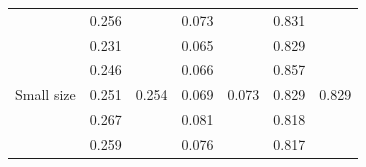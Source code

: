 \documentclass[conference]{IEEEtran}
\begin{document}
\begin{table}[]
\begin{tabular}{|l|cc|cc|cc|}
                                                      & \multicolumn{1}{c|}{\cellcolor[HTML]{FFFFFF}0.256} & \cellcolor[HTML]{FFFFFF}                         & \multicolumn{1}{c|}{\cellcolor[HTML]{FFFFFF}0.073} & \cellcolor[HTML]{FFFFFF}                           & \multicolumn{1}{c|}{\cellcolor[HTML]{FFFFFF}0.831} & \cellcolor[HTML]{FFFFFF}                        \\ \cline{2-2} \cline{4-4} \cline{6-6}
                                                      & \multicolumn{1}{c|}{\cellcolor[HTML]{FFFFFF}0.231} & \cellcolor[HTML]{FFFFFF}                         & \multicolumn{1}{c|}{\cellcolor[HTML]{FFFFFF}0.065} & \cellcolor[HTML]{FFFFFF}                           & \multicolumn{1}{c|}{\cellcolor[HTML]{FFFFFF}0.829} & \cellcolor[HTML]{FFFFFF}                        \\ \cline{2-2} \cline{4-4} \cline{6-6}
                                                      & \multicolumn{1}{c|}{\cellcolor[HTML]{FFFFFF}0.246} & \cellcolor[HTML]{FFFFFF}                         & \multicolumn{1}{c|}{\cellcolor[HTML]{FFFFFF}0.066} & \cellcolor[HTML]{FFFFFF}                           & \multicolumn{1}{c|}{\cellcolor[HTML]{FFFFFF}0.857} & \cellcolor[HTML]{FFFFFF}                        \\ \cline{2-2} \cline{4-4} \cline{6-6}
  \multirow{-5}{*}{Small size}            & \multicolumn{1}{c|}{\cellcolor[HTML]{FFFFFF}0.251} & \multirow{-5}{*}{\cellcolor[HTML]{FFFFFF}0.254} & \multicolumn{1}{c|}{\cellcolor[HTML]{FFFFFF}0.069} & \multirow{-5}{*}{\cellcolor[HTML]{FFFFFF}0.073} & \multicolumn{1}{c|}{\cellcolor[HTML]{FFFFFF}0.829} & \multirow{-5}{*}{\cellcolor[HTML]{FFFFFF}0.829} \\ \hline
                                                      & \multicolumn{1}{c|}{\cellcolor[HTML]{FFFFFF}0.267} & \cellcolor[HTML]{FFFFFF}                         & \multicolumn{1}{c|}{\cellcolor[HTML]{FFFFFF}0.081} & \cellcolor[HTML]{FFFFFF}                           & \multicolumn{1}{c|}{\cellcolor[HTML]{FFFFFF}0.818} & \cellcolor[HTML]{FFFFFF}                        \\ \cline{2-2} \cline{4-4} \cline{6-6}
                                                      & \multicolumn{1}{c|}{\cellcolor[HTML]{FFFFFF}0.259} & \cellcolor[HTML]{FFFFFF}                         & \multicolumn{1}{c|}{\cellcolor[HTML]{FFFFFF}0.076} & \cellcolor[HTML]{FFFFFF}                           & \multicolumn{1}{c|}{\cellcolor[HTML]{FFFFFF}0.817} & \cellcolor[HTML]{FFFFFF}                        \\ \cline{2-2} \cline{4-4} \cline{6-6}

\end{tabular}
\end{table}
\end{document}
